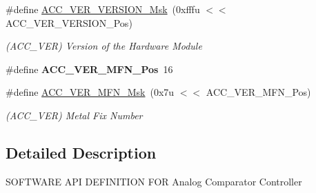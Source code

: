 \begin{DoxyCompactItemize}
\mbox{\label{group__SAMV71__ACC_ga2fc5d9b5376a7bb289af7973875ce2ef}} 
\#define \mbox{\hyperlink{group__SAMV71__ACC_ga2fc5d9b5376a7bb289af7973875ce2ef}{A\+C\+C\+\_\+\+V\+E\+R\+\_\+\+V\+E\+R\+S\+I\+O\+N\+\_\+\+Msk}}~(0xfffu $<$$<$ A\+C\+C\+\_\+\+V\+E\+R\+\_\+\+V\+E\+R\+S\+I\+O\+N\+\_\+\+Pos)
\begin{DoxyCompactList}\small\item\em (A\+C\+C\+\_\+\+V\+ER) Version of the Hardware Module \end{DoxyCompactList}\item 
\mbox{\label{group__SAMV71__ACC_ga25d56aabd155cf6db609a3e80ebcb90f}} 
\#define {\bfseries A\+C\+C\+\_\+\+V\+E\+R\+\_\+\+M\+F\+N\+\_\+\+Pos}~16
\item 
\mbox{\label{group__SAMV71__ACC_ga8e654a0f84aa4d089f9cdc90a59827ef}} 
\#define \mbox{\hyperlink{group__SAMV71__ACC_ga8e654a0f84aa4d089f9cdc90a59827ef}{A\+C\+C\+\_\+\+V\+E\+R\+\_\+\+M\+F\+N\+\_\+\+Msk}}~(0x7u $<$$<$ A\+C\+C\+\_\+\+V\+E\+R\+\_\+\+M\+F\+N\+\_\+\+Pos)
\begin{DoxyCompactList}\small\item\em (A\+C\+C\+\_\+\+V\+ER) Metal Fix Number \end{DoxyCompactList}\end{DoxyCompactItemize}


\subsection{Detailed Description}
S\+O\+F\+T\+W\+A\+RE A\+PI D\+E\+F\+I\+N\+I\+T\+I\+ON F\+OR Analog Comparator Controller 